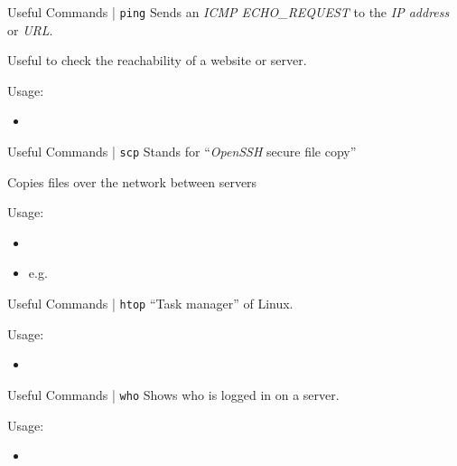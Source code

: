 \documentclass{setbeamer}
\begin{document}
\begin{frame}{Useful Commands | \texttt{ping}}
    Sends an \emph{ICMP ECHO\_REQUEST} to the \emph{IP address} or \emph{URL}.

    \vspace{0.3cm}

   Useful to check the reachability of a website or server.

    \vspace{0.3cm}

    Usage:
    \begin{itemize}
        \item {}
    \end{itemize}
\end{frame}

\begin{frame}{Useful Commands | \texttt{scp}}
    Stands for ``\emph{OpenSSH} secure file copy''

    \vspace{0.3cm}

   Copies files over the network between servers

    \vspace{0.3cm}

    Usage:
    \begin{itemize}
        \item {}
        \item e.g. 
    \end{itemize}
\end{frame}

\begin{frame}{Useful Commands | \texttt{htop}}
    ``Task manager'' of Linux.

    \vspace{0.3cm}

    Usage:
    \begin{itemize}
        \item {}
    \end{itemize}
\end{frame}

\begin{frame}{Useful Commands | \texttt{who}}
    Shows who is logged in on a server.

    \vspace{0.3cm}

    Usage:
    \begin{itemize}
        \item {}
    \end{itemize}
\end{frame}
\end{document}
